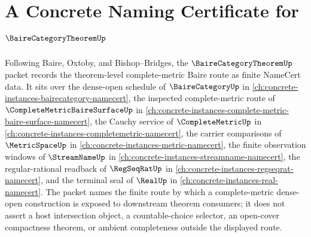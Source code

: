 \chapter{A Concrete Naming Certificate for $\BaireCategoryTheoremUp$}
\label{ch:concrete-instances-baire-category-theorem-namecert}

Following Baire, Oxtoby, and Bishop--Bridges, the $\BaireCategoryTheoremUp$ packet records the theorem-level complete-metric Baire route as finite NameCert data. It sits over the dense-open schedule of $\BaireCategoryUp$ in \autoref{ch:concrete-instances-bairecategory-namecert}, the inspected complete-metric route of $\CompleteMetricBaireSurfaceUp$ in \autoref{ch:concrete-instances-complete-metric-baire-surface-namecert}, the Cauchy service of $\CompleteMetricUp$ in \autoref{ch:concrete-instances-completemetric-namecert}, the carrier comparisons of $\MetricSpaceUp$ in \autoref{ch:concrete-instances-metric-namecert}, the finite observation windows of $\StreamNameUp$ in \autoref{ch:concrete-instances-streamname-namecert}, the regular-rational readback of $\RegSeqRatUp$ in \autoref{ch:concrete-instances-regseqrat-namecert}, and the terminal seal of $\RealUp$ in \autoref{ch:concrete-instances-real-namecert}. The packet names the finite route by which a complete-metric dense-open construction is exposed to downstream theorem consumers; it does not assert a host intersection object, a countable-choice selector, an open-cover compactness theorem, or ambient completeness outside the displayed route.

